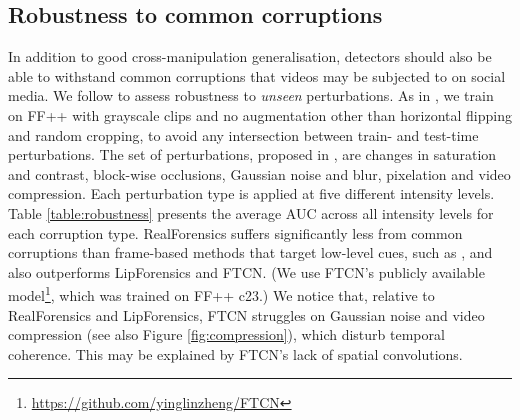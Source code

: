 \documentclass[10pt,twocolumn,letterpaper]{article}
\begin{document}
\begin{table}
\begin{center}
\end{center}
\caption{\textbf{Parameters and generalisation accuracy.} Number of parameters (in millions), at test-time, for related state-of-the-art methods, and accuracy on FaceShifter (FSh) and DeeperForensics (DFo) after training on FaceForensics++. Best results are in \textbf{bold}.}
\label{table:params}
\end{table}

\subsection{Robustness to common corruptions}
In addition to good cross-manipulation generalisation, detectors should also be able to withstand common corruptions that videos may be subjected to on social media. We follow \cite{haliassos2021lips} to assess robustness to \textit{unseen} perturbations. As in \cite{haliassos2021lips}, we train on FF++ with grayscale clips and no augmentation other than horizontal flipping and random cropping, to avoid any intersection between train- and test-time perturbations. The set of perturbations, proposed in \cite{jiang2020deeperforensics}, are changes in saturation and contrast, block-wise occlusions, Gaussian noise and blur, pixelation and video compression. Each perturbation type is applied at five different intensity levels. Table \ref{table:robustness} presents the average AUC across all intensity levels for each corruption type. RealForensics suffers significantly less from common corruptions than frame-based methods that target low-level cues, such as \cite{li2020face, chai2020makes}, and also outperforms LipForensics and FTCN. (We use FTCN's publicly available model\footnote{\url{https://github.com/yinglinzheng/FTCN}}, which was trained on FF++ c23.) We notice that, relative to RealForensics and LipForensics, FTCN struggles on Gaussian noise and video compression (see also Figure \ref{fig:compression}), which disturb temporal coherence. This may be explained by FTCN's lack of spatial convolutions.
\end{document}
